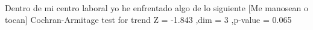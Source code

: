 Dentro de mi centro laboral yo he enfrentado algo de lo siguiente [Me manosean o tocan]
Cochran-Armitage test for trend
Z = -1.843 ,dim = 3 ,p-value =  0.065
